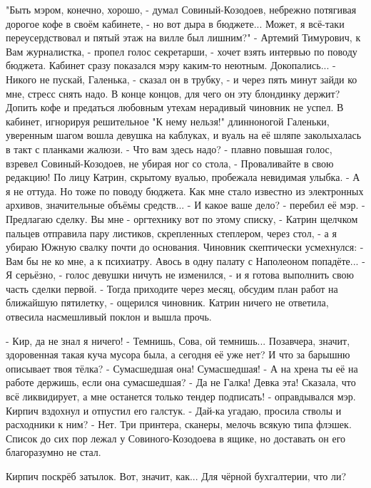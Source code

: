 "Быть мэром, конечно, хорошо, - думал Совиный-Козодоев, небрежно потягивая дорогое кофе в своём кабинете, - но вот дыра в бюджете... Может, я всё-таки переусердствовал и пятый этаж на вилле был лишним?"
 - Артемий Тимурович, к Вам журналистка, - пропел голос секретарши, - хочет взять интервью по поводу бюджета.
Кабинет сразу показался мэру каким-то неютным. Докопались...
 - Никого не пускай, Галенька, - сказал он в трубку, - и через пять минут зайди ко мне, стресс снять надо.
В конце концов, для чего он эту блондинку держит?
Допить кофе и предаться любовным утехам нерадивый чиновник не успел. В кабинет, игнорируя решительное "К нему нельзя!" длинноногой Галеньки, уверенным шагом вошла девушка на каблуках, и вуаль на её шляпе заколыхалась в такт с планками жалюзи.
 - Что вам здесь надо? - плавно повышая голос, взревел Совиный-Козодоев, не убирая ног со стола, - Проваливайте в свою редакцию!
По лицу Катрин, скрытому вуалью, пробежала невидимая улыбка.
 - А я не оттуда. Но тоже по поводу бюджета. Как мне стало известно из электронных архивов, значительные объёмы средств...
 - И какое ваше дело? - перебил её мэр.
 - Предлагаю сделку. Вы мне - оргтехнику вот по этому списку, - Катрин щелчком пальцев отправила пару листиков, скрепленных степлером, через стол, - а я убираю Южную свалку почти до основания.
Чиновник скептически усмехнулся:
 - Вам бы не ко мне, а к психиатру. Авось в одну палату с Наполеоном попадёте...
 - Я серьёзно, - голос девушки ничуть не изменился, - и я готова выполнить свою часть сделки первой.
 - Тогда приходите через месяц, обсудим план работ на ближайшую пятилетку, - ощерился чиновник.
Катрин ничего не ответила, отвесила насмешливый поклон и вышла прочь.




 - Кир, да не знал я ничего!
 - Темнишь, Сова, ой темнишь... Позавчера, значит, здоровенная такая куча мусора была, а сегодня её уже нет? И что за барышню описывает твоя тёлка?
 - Сумасшедшая она! Сумасшедшая!
 - А на хрена ты её на работе держишь, если она сумасшедшая?
 - Да не Галка! Девка эта! Сказала, что всё ликвидирует, а мне останется только тендер подписать! - оправдывался мэр.
Кирпич вздохнул и отпустил его галстук.
 - Дай-ка угадаю, просила стволы и расходники к ним?
 - Нет. Три принтера, сканеры, мелочь всякую типа флэшек.
Список до сих пор лежал у Совиного-Козодоева в ящике, но доставать он его благоразумно не стал.

Кирпич поскрёб затылок. Вот, значит, как... Для чёрной бухгалтерии, что ли?

